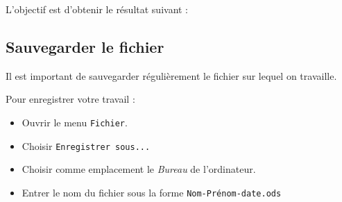 L'objectif est d'obtenir le résultat suivant :

\begin{center}\label{modelePage}\end{center}



\subsection{Sauvegarder le fichier}

Il est important de sauvegarder régulièrement le fichier sur lequel on travaille.

Pour enregistrer votre travail :
\begin{itemize}
\item Ouvrir le menu \texttt{Fichier}.
\item Choisir \texttt{Enregistrer sous...}
\item Choisir comme emplacement le \emph{Bureau} de l'ordinateur.
\item Entrer le nom du fichier sous la forme \texttt{Nom-Prénom-date.ods}
\end{itemize}

